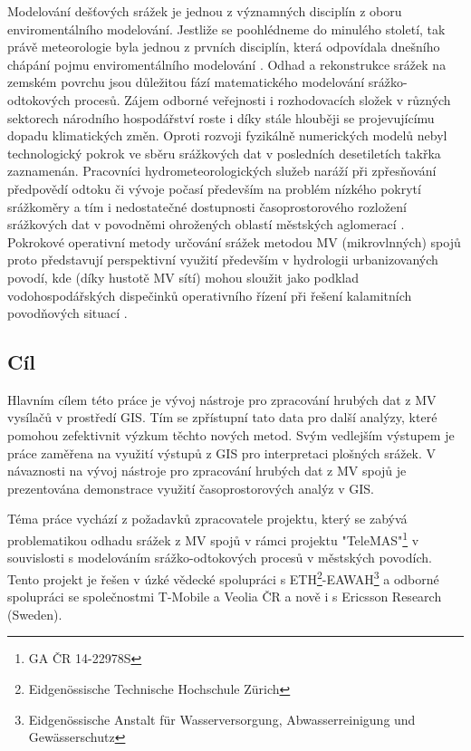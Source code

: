 \documentclass[a4paper,12pt,oneside]{report}
\begin{document}
Modelování dešťových srážek je jednou z významných disciplín z oboru
enviromentálního modelování. Jestliže se poohlédneme do 
minulého století, tak právě meteorologie byla jednou z prvních
disciplín, která odpovídala dnešního chápání pojmu enviromentálního
modelování \cite{wpc, neuman}. Odhad a rekonstrukce srážek na 
zemském povrchu jsou důležitou fází matematického modelování srážko-odtokových
procesů. Zájem odborné veřejnosti i rozhodovacích složek v různých
sektorech národního hospodářství roste i díky stále hlouběji se
projevujícímu dopadu klimatických změn. Oproti rozvoji fyzikálně
numerických modelů nebyl technologický pokrok ve sběru srážkových dat
v posledních desetiletích takřka zaznamenán. Pracovníci
hydrometeorologických služeb naráží při zpřesňování předpovědí odtoku
či vývoje počasí především na problém nízkého pokrytí srážkoměry a tím
i nedostatečné dostupnosti časoprostorového rozložení srážkových dat v
povodněmi ohrožených oblastí městských aglomerací \cite{slavicek}. Pokrokové
operativní metody určování srážek metodou MV (mikrovlnných) spojů proto představují
perspektivní využití především v hydrologii urbanizovaných povodí, kde
(díky hustotě MV sítí) mohou sloužit jako podklad vodohospodářských
dispečinků operativního řízení při řešení kalamitních povodňových
situací \cite{countryw}.



\subsection*{Cíl}
Hlavním cílem této práce je vývoj nástroje pro zpracování hrubých dat
z MV vysílačů v prostředí GIS. Tím se zpřístupní tato data pro další analýzy, které
pomohou zefektivnit výzkum těchto nových metod. Svým vedlejším
výstupem je práce zaměřena na využití výstupů z GIS
pro interpretaci plošných srážek. V návaznosti na vývoj nástroje pro
zpracování hrubých dat z MV spojů je prezentována demonstrace využití
časoprostorových analýz v GIS.

Téma práce vychází z požadavků zpracovatele projektu, který se zabývá
problematikou odhadu srážek z MV spojů v rámci projektu
"TeleMAS"\footnote{GA ČR 14-22978S } v souvislosti s
modelováním srážko-odtokových procesů v městských povodích. Tento
projekt je řešen v úzké vědecké spolupráci s ETH\footnote{
  Eidgenössische Technische Hochschule
  Zürich}-EAWAH\footnote{Eidgenössische Anstalt für Wasserversorgung,
  Abwasserreinigung und Gewässerschutz} a odborné spolupráci se
společnostmi T-Mobile a Veolia ČR a nově i s Ericsson Research
(Sweden).
\end{document}
